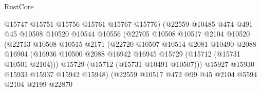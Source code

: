 \begin{lexlean}{RustCore}
\begin{coremodule}
                                    @15747
                                    @15751
                                    @15756
                                    @15761
                                    @15767
                                    @15776)
                                  (@22559
                                    @10485
                                    @474
                                    @491
                                    @45
                                    @10508
                                    @10520
                                    @10544
                                    @10556
                                    (@22705
                                      @10508
                                      @10517
                                      @2104
                                      @10520
                                      (@22713
                                        @10508
                                        @10515
                                        @2171
                                        (@22720
                                          @10507
                                          @10514
                                          @2081
                                          @10490
                                          @2088
                                          @16904
                                          (@16936
                                            @10500
                                            @2088
                                            @16942
                                            @16945
                                            @15729
                                            (@15712 (@15731 @10501 @2104)))
                                          @15729
                                          (@15712 (@15731 @10491 @10507)))
                                        @15927
                                        @15930
                                        @15933
                                        @15937
                                        @15942
                                        @15948)
                                      (@22559
                                        @10517
                                        @472
                                        @99
                                        @45
                                        @2104
                                        @5594
                                        @2104
                                        @2199
                                        @22870

\end{coremodule}
\end{lexlean}
